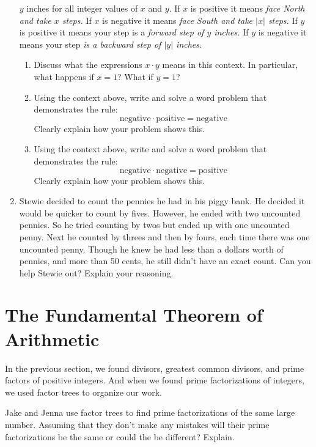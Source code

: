 \begin{problems}
\begin{enumerate}
  $y$ inches for all integer values of $x$ and $y$.  If $x$ is
  positive it means \textit{face North and take $x$ steps.} If $x$ is
  negative it means \textit{face South and take $|x|$ steps.} If $y$
  is positive it means your step is a \textit{forward step of $y$
    inches.} If $y$ is negative it means your step \textit{is a
    backward step of $|y|$ inches.}
\begin{enumerate}
\item Discuss what the expressions $x \cdot y$ means in this
  context. In particular, what happens if $x = 1$? What if $y=1$?
\item Using the context above, write and solve a word problem that
  demonstrates the rule:
\[
\text{negative}\cdot \text{positive} = \text{negative}
\]
Clearly explain how your problem shows this.
\item Using the context above, write and solve a word problem that
  demonstrates the rule:
\[
\text{negative}\cdot \text{negative} = \text{positive}
\]
Clearly explain how your problem shows this.
\end{enumerate}
\item Stewie decided to count the pennies he had in his piggy bank. He
  decided it would be quicker to count by fives. However, he ended
  with two uncounted pennies. So he tried counting by twos but ended
  up with one uncounted penny. Next he counted by threes and then by
  fours, each time there was one uncounted penny. Though he knew he
  had less than a dollars worth of pennies, and more than 50 cents, he
  still didn't have an exact count. Can you help Stewie out? Explain
  your reasoning.
\end{enumerate}
\end{problems}





\section{The Fundamental Theorem of Arithmetic}\label{S:FT}
In the previous section, we found divisors, greatest common divisors, and prime factors of positive integers.  And when we
 found prime factorizations of integers, we used factor trees to organize our work.  

\begin{question}
Jake and Jenna use factor trees to find prime factorizations of the same large number.  Assuming that they don't make any mistakes will their prime factorizations be the same or could the be different?  Explain.  
\end{question}
\QM

